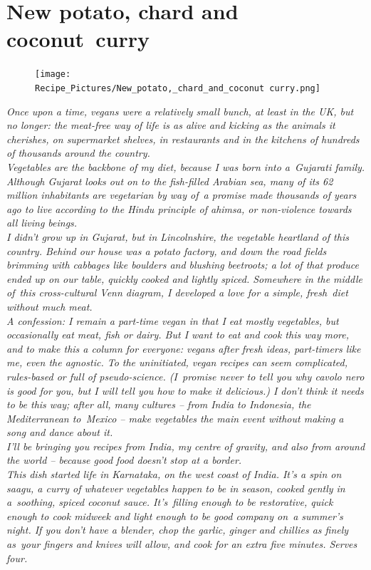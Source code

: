 \documentclass{book}
\begin{document}
\section{New potato, chard and coconut curry}
\begin{figure}
\centering\texttt{[image: Recipe\_Pictures/New\_potato,\_chard\_and\_coconut curry.png]}
\end{figure}
\emph{Once upon a time, vegans were a relatively small bunch, at least in the UK, but no longer: the meat-free way of life is as alive and kicking as the animals it cherishes, on supermarket shelves, in restaurants and in the kitchens of hundreds of thousands around the country.\\ 
Vegetables are the backbone of my diet, because I was born into a Gujarati family. Although Gujarat looks out on to the fish-filled Arabian sea, many of its 62 million inhabitants are vegetarian by way of a promise made thousands of years ago to live according to the Hindu principle of ahimsa, or non-violence towards all living beings.\\ 
I didn’t grow up in Gujarat, but in Lincolnshire, the vegetable heartland of this country. Behind our house was a potato factory, and down the road fields brimming with cabbages like boulders and blushing beetroots; a lot of that produce ended up on our table, quickly cooked and lightly spiced. Somewhere in the middle of this cross-cultural Venn diagram, I developed a love for a simple, fresh diet without much meat.\\ 
A confession: I remain a part-time vegan in that I eat mostly vegetables, but occasionally eat meat, fish or dairy. But I want to eat and cook this way more, and to make this a column for everyone: vegans after fresh ideas, part-timers like me, even the agnostic. To the uninitiated, vegan recipes can seem complicated, rules-based or full of pseudo-science. (I promise never to tell you why cavolo nero is good for you, but I will tell you how to make it delicious.) I don’t think it needs to be this way; after all, many cultures – from India to Indonesia, the Mediterranean to Mexico – make vegetables the main event without making a song and dance about it.\\ 
I’ll be bringing you recipes from India, my centre of gravity, and also from around the world – because good food doesn’t stop at a border.\\ 
This dish started life in Karnataka, on the west coast of India. It’s a spin on saagu, a curry of whatever vegetables happen to be in season, cooked gently in a soothing, spiced coconut sauce. It’s filling enough to be restorative, quick enough to cook midweek and light enough to be good company on a summer’s night. If you don’t have a blender, chop the garlic, ginger and chillies as finely as your fingers and knives will allow, and cook for an extra five minutes. Serves four.}\\\\ 
\end{document}
